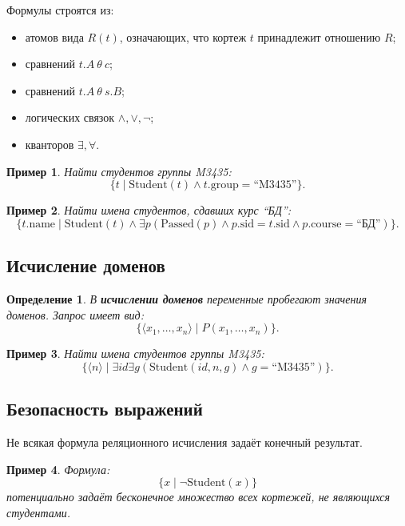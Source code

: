 \documentclass[12pt,a4paper]{article}
\newtheorem{definition}{Определение}[section]
\newtheorem{example}{Пример}[section]
\theoremstyle{remark}
\begin{document}
Формулы строятся из:
\begin{itemize}
    \item атомов вида $R(t)$, означающих, что кортеж $t$ принадлежит отношению $R$;
    \item сравнений $t.A \ \theta \ c$;
    \item сравнений $t.A \ \theta \ s.B$;
    \item логических связок $\wedge, \vee, \neg$;
    \item кванторов $\exists, \forall$.
\end{itemize}

\begin{example}
Найти студентов группы M3435:
\[
\{t \mid \text{Student}(t) \wedge t.\text{group} = \text{``M3435''}\}.
\]
\end{example}

\begin{example}
Найти имена студентов, сдавших курс ``БД'':
\[
\{t.\text{name} \mid
\text{Student}(t) \wedge
\exists p(
\text{Passed}(p)
\wedge p.\text{sid}=t.\text{sid}
\wedge p.\text{course}=\text{``БД''})
\}.
\]
\end{example}

\subsection{Исчисление доменов}

\begin{definition}
В \textbf{исчислении доменов} переменные пробегают значения доменов.
Запрос имеет вид:
\[
\{ \langle x_1,\dots,x_n\rangle \mid P(x_1,\dots,x_n)\}.
\]
\end{definition}

\begin{example}
Найти имена студентов группы M3435:
\[
\{ \langle n\rangle \mid
\exists id \exists g(
\text{Student}(id,n,g)
\wedge g = \text{``M3435''})
\}.
\]
\end{example}

\subsection{Безопасность выражений}

Не всякая формула реляционного исчисления задаёт конечный результат.

\begin{example}
Формула:
\[
\{x \mid \neg \text{Student}(x)\}
\]
потенциально задаёт бесконечное множество всех кортежей, не являющихся студентами.
\end{example}
\end{document}
